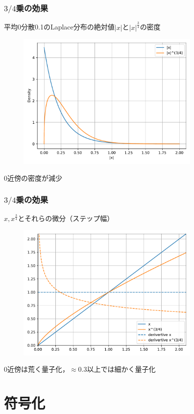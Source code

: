 \documentclass[14pt,xcolor=dvipsnames,table,dvipdfmx]{beamer}
\begin{document}
\begin{frame}[c]
    \frametitle{$3/4$乗の効果}
    平均0分散0.1のLaplace分布の絶対値$|x|$と$|x|^{\frac{3}{4}}$の密度
    \begin{figure}
        \includegraphics[width=90mm]{./figs/powered_distribution.pdf}
    \end{figure}
    \vspace{-10pt}
    $0$近傍の密度が減少
\end{frame}

\begin{frame}[c]
    \frametitle{$3/4$乗の効果}
    $x, x^{\frac{3}{4}}$とそれらの微分（ステップ幅）
    \begin{figure}
        \includegraphics[width=90mm]{./figs/powered_quantization_curve.pdf}
    \end{figure}
    \vspace{-10pt}
    $0$近傍は荒く量子化，$\approx 0.3$以上では細かく量子化
\end{frame}

\section{符号化}
\end{document}
